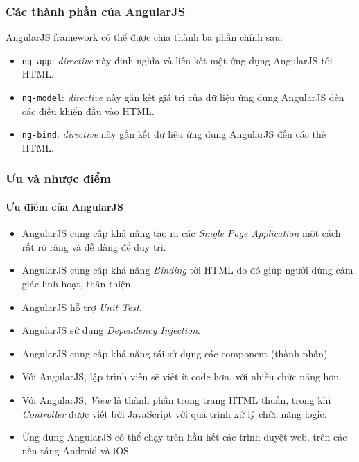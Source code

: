 \documentclass[a4paper]{article}
\begin{document}
\subsubsection{Các thành phần của AngularJS}
AngularJS framework có thể được chia thành ba phần chính sau:
\begin{itemize}
	\item \lstinline{ng-app}: \textit{directive} này định nghĩa và liên kết một ứng dụng AngularJS tới HTML.

	\item \lstinline{ng-model}: \textit{directive} này gắn kết giá trị của dữ liệu ứng dụng AngularJS đến các điều khiển đầu vào HTML.

	\item \lstinline{ng-bind}: \textit{directive} này gắn kết dữ liệu ứng dụng AngularJS đến các thẻ HTML.
\end{itemize}
\subsubsection{Ưu và nhược điểm}
\paragraph*{Ưu điểm của AngularJS}
\begin{itemize}
	\item AngularJS cung cấp khả năng tạo ra các \textit{Single Page Application} một cách rất rõ ràng và dễ dàng để duy trì.

	\item AngularJS cung cấp khả năng \textit{Binding} tới HTML do đó giúp người dùng cảm giác linh hoạt, thân thiện.

	\item AngularJS hỗ trợ \textit{Unit Test}.

	\item AngularJS sử dụng \textit{Dependency Injection}.

	\item AngularJS cung cấp khả năng tái sử dụng các component (thành phần).

	\item Với AngularJS, lập trình viên sẽ viết ít code hơn, với nhiều chức năng hơn.

	\item Với AngularJS, \textit{View} là thành phần trong trang HTML thuần, trong khi \textit{Controller} được viết bởi JavaScript với quá trình xử lý chức năng logic.
	\item Ứng dụng AngularJS có thể chạy trên hầu hết các trình duyệt web, trên các nền tảng Android và iOS.	
\end{itemize}
\end{document}
